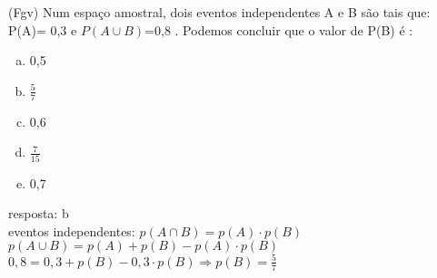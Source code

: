 \begin{ex}
(Fgv) Num espaço amostral, dois eventos independentes A e B são tais que: P(A)= 0,3  e  $ P(A\cup B) $=0,8 . Podemos concluir que o valor de P(B) é :
   \begin{enumerate}[(a)]
   \item 0,5
   \item $\frac{5}{7}$
   \item 0,6
   \item $\frac{7}{15}$
   \item 0,7
   \end{enumerate}
     \begin{sol}
     resposta: b \\
     eventos independentes: $p(A \cap B)=p(A) \cdot p(B)$ \hspace{0,5cm}
     $p(A \cup B) = p(A)+p(B)-p(A)\cdot p(B)$ \\
     $0,8=0,3+p(B)-0,3\cdot p(B) \Longrightarrow p(B)=\frac{5}{7}$
    \end{sol}
    
\end{ex}
